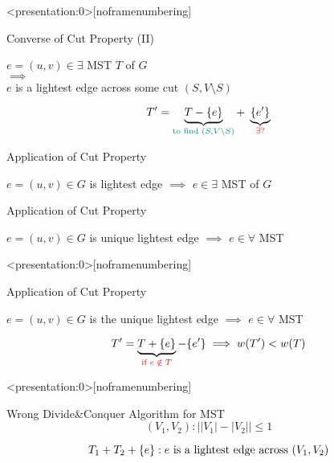 \begin{frame}<presentation:0>[noframenumbering]
  \begin{exampleblock}{Converse of Cut Property (II)}
    \begin{center}
      $e = (u,v) \in \exists$ MST $T$ of $G$ \\[6pt]
      $\implies$ \\[6pt]
      $e$ is a lightest edge across some cut $(S, V \setminus S)$
    \end{center}
  \end{exampleblock}

  \pause
  \[
    T' = \underbrace{T - \{e\}}_{\textcolor{teal}{\text{to find } (S, V \setminus S)}} +\; \underbrace{\{e'\}}_{\textcolor{red}{\exists?}}
  \]
\end{frame}

\begin{frame}{}
  \begin{exampleblock}{Application of Cut Property }
	\centerline{$e = (u,v) \in G$ is  lightest edge $\implies$ $e \in \exists$ MST of $G$}
  \end{exampleblock}


  \begin{exampleblock}{Application of Cut Property }
	\centerline{$e = (u,v) \in G$ is  unique lightest edge $\implies$ $e \in \forall$ MST}
  \end{exampleblock}
\end{frame}

\begin{frame}<presentation:0>[noframenumbering]
  \begin{exampleblock}{Application of Cut Property }
    \centerline{$e = (u,v) \in G$ is the unique lightest edge $\implies$ $e \in \forall$ MST}
  \end{exampleblock}

  \pause
  \vspace{0.50cm}
  \[
    T' = \underbrace{T + \{e\}}_{\textcolor{red}{\text{if } e \;\notin\; T}} - \{e'\} \implies w(T') < w(T)
  \]
\end{frame}

\begin{frame}<presentation:0>[noframenumbering]
  \begin{exampleblock}{Wrong Divide\&Conquer Algorithm for MST }
    \[
      (V_{1}, V_{2}): \Big\rvert |V_{1}| - |V_{2}| \Big\rvert \le 1
    \]
    
    \[
      T_{1} + T_{2} + \{e\}: e \text{ is a lightest edge across } (V_{1}, V_{2})
    \]
  \end{exampleblock}

  \pause
  \vspace{0.30cm}
\end{frame}
